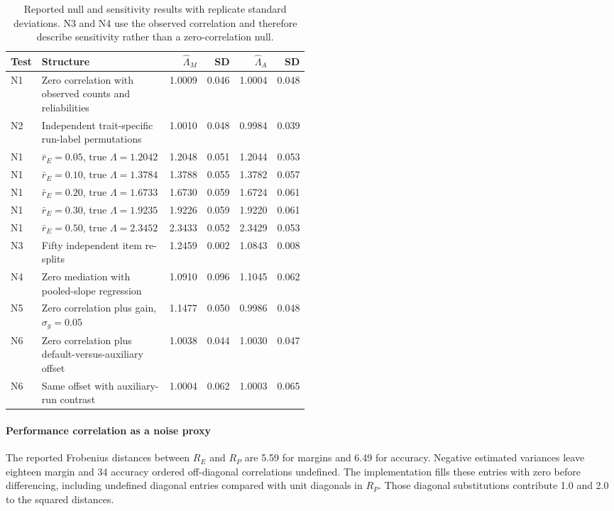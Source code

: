 \begin{table}[htbp]
\centering\small\setlength{\tabcolsep}{3pt}
\caption{Reported null and sensitivity results with replicate standard deviations. N3 and N4 use the observed correlation and therefore describe sensitivity rather than a zero-correlation null.}
\label{tab:original9}
\begin{tabular}{lp{0.49\linewidth}rrrr}\hline
Test & Structure & $\widehat\Lambda_M$ & SD & $\widehat\Lambda_A$ & SD\\\hline
N1 & Zero correlation with observed counts and reliabilities & 1.0009 & 0.046 & 1.0004 & 0.048\\
N2 & Independent trait-specific run-label permutations & 1.0010 & 0.048 & 0.9984 & 0.039\\
N1 & $\bar r_E=0.05$, true $\Lambda=1.2042$ & 1.2048 & 0.051 & 1.2044 & 0.053\\
N1 & $\bar r_E=0.10$, true $\Lambda=1.3784$ & 1.3788 & 0.055 & 1.3782 & 0.057\\
N1 & $\bar r_E=0.20$, true $\Lambda=1.6733$ & 1.6730 & 0.059 & 1.6724 & 0.061\\
N1 & $\bar r_E=0.30$, true $\Lambda=1.9235$ & 1.9226 & 0.059 & 1.9220 & 0.061\\
N1 & $\bar r_E=0.50$, true $\Lambda=2.3452$ & 2.3433 & 0.052 & 2.3429 & 0.053\\
N3 & Fifty independent item re-splits & 1.2459 & 0.002 & 1.0843 & 0.008\\
N4 & Zero mediation with pooled-slope regression & 1.0910 & 0.096 & 1.1045 & 0.062\\
N5 & Zero correlation plus gain, $\sigma_g=0.05$ & 1.1477 & 0.050 & 0.9986 & 0.048\\
N6 & Zero correlation plus default-versus-auxiliary offset & 1.0038 & 0.044 & 1.0030 & 0.047\\
N6 & Same offset with auxiliary-run contrast & 1.0004 & 0.062 & 1.0003 & 0.065\\\hline
\end{tabular}
\end{table}

\paragraph{Performance correlation as a noise proxy}
The reported Frobenius distances between $R_E$ and $R_P$ are 5.59 for margins and 6.49 for accuracy. Negative estimated variances leave eighteen margin and 34 accuracy ordered off-diagonal correlations undefined. The implementation fills these entries with zero before differencing, including undefined diagonal entries compared with unit diagonals in $R_P$. Those diagonal substitutions contribute 1.0 and 2.0 to the squared distances.

